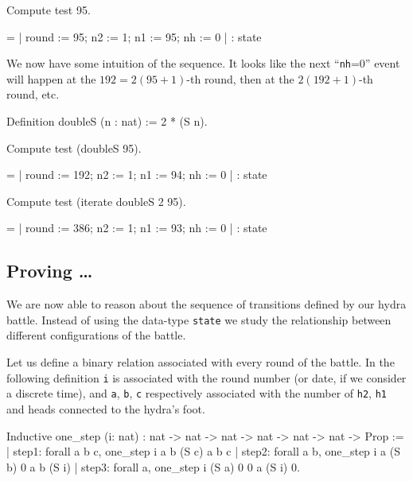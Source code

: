 \begin{Coqsrc}
 Compute test 95.
\end{Coqsrc}

\begin{Coqanswer}
  = {| round := 95; n2 := 1; n1 := 95; nh := 0 |}
     : state
\end{Coqanswer}

We now have some intuition of the sequence.
It looks like the next ``\texttt{nh}=0'' event will happen at the $192=2(95+1)$-th round, then at the $2(192+1)$-th round, etc.


\begin{Coqsrc}
Definition doubleS (n : nat) := 2 * (S n).

Compute test (doubleS 95).
\end{Coqsrc}

\begin{Coqanswer}
 = {| round := 192; n2 := 1; n1 := 94; nh := 0 |}
     : state
\end{Coqanswer}

\begin{Coqsrc}
Compute test (iterate doubleS 2 95).
\end{Coqsrc}

\begin{Coqanswer}
  = {| round := 386; n2 := 1; n1 := 93; nh := 0 |}
     : state
\end{Coqanswer}

\subsection{Proving \dots}
We are now able to reason about the sequence of transitions defined by our hydra battle. Instead of using the data-type \texttt{state} we study the relationship
between different configurations of the battle.

Let us define a binary relation associated with every round of the battle.
In the following definition \texttt{i} is associated with the round number (or date, if we consider a discrete time), and \texttt{a}, \texttt{b}, \texttt{c} respectively associated with the number of \texttt{h2}, \texttt{h1} and heads connected to the hydra's foot.

\begin{Coqsrc}
Inductive one_step (i: nat) :
  nat -> nat -> nat -> nat -> nat -> nat -> Prop :=
| step1: forall a b c, one_step i a b (S c) a b c
| step2:  forall a b, one_step i a (S b) 0 a b (S i)
| step3: forall a, one_step i (S a) 0 0 a (S i) 0.
\end{Coqsrc}

